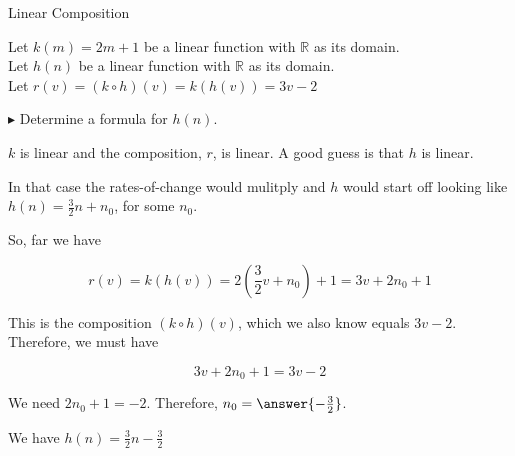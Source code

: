 \documentclass{ximera}
\begin{document}
\begin{example} Linear Composition

Let $k(m) = 2 m + 1$ be a linear function with $\mathbb{R}$ as its domain. \\
Let $h(n)$ be a linear function with $\mathbb{R}$ as its domain. \\


Let $r(v) = (k \circ h)(v) = k(h(v)) = 3 v - 2$ 

$\blacktriangleright$ Determine a formula for $h(n)$.





\begin{explanation}


$k$ is linear and the composition, $r$, is linear. A good guess is that $h$ is linear.  

In that case the rates-of-change would mulitply and $h$ would start off looking like $h(n) = \frac{3}{2} n + n_0$, for some $n_0$.


So, far we have 

\[   r(v) = k(h(v)) = 2 \left(\frac{3}{2} v + n_0\right) + 1  = 3v + 2 n_0 + 1\]




This is the composition $(k \circ h)(v)$, which we also know equals $3 v - 2$.  Therefore, we must have 

\[
3 v + 2 n_0 + 1  = 3 v - 2
\]



We need $2 n_0 + 1 = -2$.  Therefore, $n_0 = \answer{-\frac{3}{2}}$.


We have $h(n) = \frac{3}{2} n - \frac{3}{2}$


\end{explanation}
\end{example}
\end{document}
